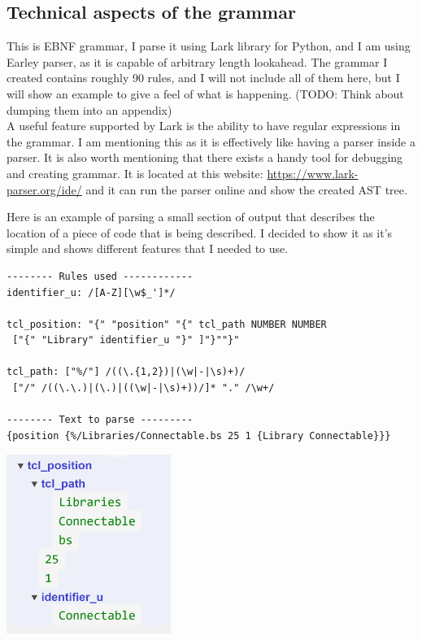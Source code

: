 \documentclass[12pt]{report}
\begin{document}
\subsection{Technical aspects of the grammar}
This is EBNF grammar, I parse it using Lark library for Python, and I am using Earley parser, as it is capable of arbitrary length lookahead. The grammar I created contains roughly 90 rules, and I will not include all of them here, but I will show an example to give a feel of what is happening. (TODO: Think about dumping them into an appendix)   
\\   
A useful feature supported by Lark is the ability to have regular expressions in the grammar. I am mentioning this as it is effectively like having a parser inside a parser. It is also worth mentioning that there exists a handy tool for debugging and creating grammar. It is located at this website: \href{https://www.lark-parser.org/ide/}{https://www.lark-parser.org/ide/} and it can run the parser online and show the created AST tree. 
\begin{tcolorbox}[title = Example of a paring rule and the resulting AST]
Here is an example of parsing a small section of output that describes the location of a piece of code that is being described. I decided to show it as it's simple and shows different features that I needed to use.
    \begin{verbatim}
-------- Rules used ------------
identifier_u: /[A-Z][\w$_']*/

tcl_position: "{" "position" "{" tcl_path NUMBER NUMBER 
 ["{" "Library" identifier_u "}" ]"}""}"

tcl_path: ["%/"] /((\.{1,2})|(\w|-|\s)+)/ 
 ["/" /((\.\.)|(\.)|((\w|-|\s)+))/]* "." /\w+/

-------- Text to parse ---------
{position {%/Libraries/Connectable.bs 25 1 {Library Connectable}}}
    \end{verbatim}
    \includegraphics[width=0.4\textwidth]{images/TCLPath.png}
\end{tcolorbox}
\end{document}
